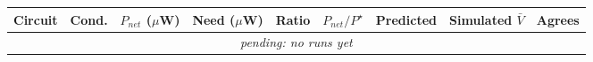 \begin{tabular}{llrrrrlll}
\toprule
Circuit & Cond. & $P_{net}$ ($\mu$W) & Need ($\mu$W) & Ratio & $P_{net}/P^\star$ & Predicted & Simulated $\bar V$ & Agrees \\
\midrule
\multicolumn{9}{c}{\textit{pending: no runs yet}} \\
\bottomrule
\end{tabular}
